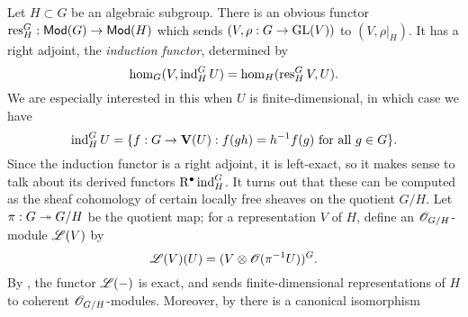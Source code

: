 Let $H\subset G$ be an algebraic subgroup. There is an obvious functor 
$\operatorname{res}_H^G:\mathsf{Mod}(G)\to \mathsf{Mod}(H)$ which sends $(V,\rho:G\to \operatorname{GL}(V))$ 
to $(V,\rho|_H)$. It has a right adjoint, the \emph{induction functor}, 
determined by 
\[
  \hom_G(V,\operatorname{ind}_H^G U) = \hom_H(\operatorname{res}_H^G V,U) .
\]
We are especially interested in this when $U$ is finite-dimensional, in which 
case we have 
\[
  \operatorname{ind}_H^G U = \{f:G\to \mathbf{V}(U):f(g h) = h^{-1} f(g)\text{ for all }g\in G\} .
\]
Since the induction functor is a right adjoint, it is left-exact, so it 
makes sense to talk about its derived functors $\mathrm{R}^\bullet\operatorname{ind}_H^G$. It 
turns out that these can be computed as the sheaf cohomology of certain 
locally free sheaves on the quotient $G/H$. Let $\pi:G\twoheadrightarrow G/H$ be the 
quotient map; for a representation $V$ of $H$, define an $\mathscr{O}_{G/H}$-module 
$\mathscr{L}(V)$ by 
\[
  \mathscr{L}(V)(U) = (V\otimes \mathscr{O}(\pi^{-1} U))^G .
\]
By \cite[I 5.9]{jantzen-2003}, the functor $\mathscr{L}(-)$ is exact, and sends 
finite-dimensional representations of $H$ to coherent $\mathscr{O}_{G/H}$-modules. 
Moreover, by \cite[I 5.12]{jantzen-2003} there is a canonical isomorphism 

